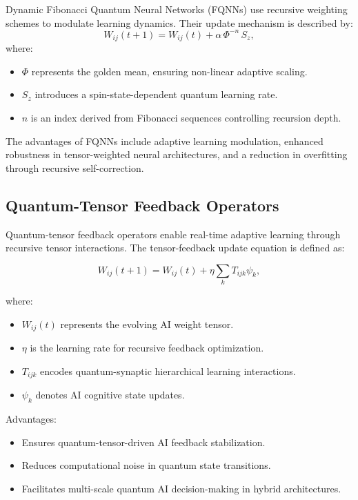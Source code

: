 \documentclass{article}
\theoremstyle{plain}
\begin{document}
\begin{itemize}
\begin{itemize}
Dynamic Fibonacci Quantum Neural Networks (FQNNs) use recursive weighting schemes to modulate learning dynamics. Their update mechanism is described by:
\begin{equation}
W_{ij}(t+1) = W_{ij}(t) + \alpha\, \Phi^{-n}\, S_z,
\end{equation}
where:
\begin{itemize}
    \item \(\Phi\) represents the golden mean, ensuring non-linear adaptive scaling.
    \item \(S_z\) introduces a spin-state-dependent quantum learning rate.
    \item \(n\) is an index derived from Fibonacci sequences controlling recursion depth.
\end{itemize}
The advantages of FQNNs include adaptive learning modulation, enhanced robustness in tensor-weighted neural architectures, and a reduction in overfitting through recursive self-correction.
\subsection{Quantum-Tensor Feedback Operators}

Quantum-tensor feedback operators enable real-time adaptive learning through recursive tensor interactions. The tensor-feedback update equation is defined as:

\begin{equation}
W_{ij}(t+1) = W_{ij}(t) + \eta \sum_{k} T_{ijk} \psi_k,
\end{equation}

where:
\begin{itemize}
    \item $W_{ij}(t)$ represents the evolving AI weight tensor.
    \item $\eta$ is the learning rate for recursive feedback optimization.
    \item $T_{ijk}$ encodes quantum-synaptic hierarchical learning interactions.
    \item $\psi_k$ denotes AI cognitive state updates.
\end{itemize}

Advantages:
\begin{itemize}
    \item Ensures quantum-tensor-driven AI feedback stabilization.
    \item Reduces computational noise in quantum state transitions.
    \item Facilitates multi-scale quantum AI decision-making in hybrid architectures.
\end{itemize}

\end{itemize}
\end{itemize}
\end{document}
